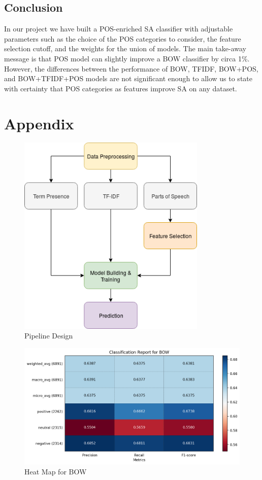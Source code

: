 \documentclass[titlepage]{article}
\begin{document}
   \subsection{Conclusion}
   In our project we have built a POS-enriched SA classifier with adjustable parameters such as the choice of the POS categories to consider, the feature selection cutoff, and the weights for the union of models. The main take-away message is that POS model can slightly improve a BOW classifier by circa 1\%. However, the differences between the performance of BOW, TFIDF, BOW+POS, and BOW+TFIDF+POS models are not significant enough to allow us to state with certainty that POS categories as features improve SA on any dataset.
  
   
\newpage
   \section{Appendix}
   
   \begin{figure}[h]
\centering
\includegraphics[width=9cm]{pics/pipeline2.png}
    \caption{Pipeline Design}
    \label{pipeline}
\end{figure}

   \begin{figure}[h!]
\centering
   \includegraphics[width=\linewidth]{pics/BOW.png}
    \caption{Heat Map for BOW}
        \label{heat_map_bow}
\end{figure}
\end{document}
